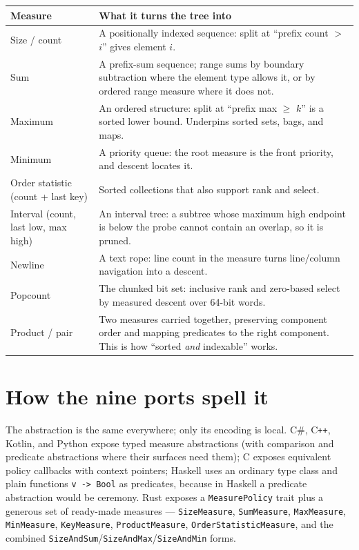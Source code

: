 \documentclass[11pt,twoside,openright]{book}
\makeatletter
\newcommand{\code}[1]{\texorpdfstring{\textcolor{d7ink}{\texttt{#1}}}{#1}}
\newenvironment{d7table}[1]
  {\par\vspace{3pt}\small
   \setlength{\LTpre}{4pt}\setlength{\LTpost}{4pt}
   \begin{longtable}{@{}%
     >{\raggedright\arraybackslash}p{#1\textwidth}%
     @{\hspace{10pt}}%
     >{\raggedright\arraybackslash}p{\dimexpr\textwidth-#1\textwidth-10pt\relax}@{}}}
  {\end{longtable}}
\newcommand{\thead}[1]{\sffamily\bfseries\footnotesize\color{d7ink}#1}
\makeatother
\begin{document}
\begin{d7table}{0.24}
\toprule
\thead{Measure} & \thead{What it turns the tree into} \\
\midrule
Size / count & A positionally indexed sequence: split at ``prefix count $>$ $i$''
gives element $i$. \\
Sum & A prefix-sum sequence; range sums by boundary subtraction where the
element type allows it, or by ordered range measure where it does not. \\
Maximum & An ordered structure: split at ``prefix max $\geq$ $k$'' is a sorted
lower bound. Underpins sorted sets, bags, and maps. \\
Minimum & A priority queue: the root measure is the front priority, and descent
locates it. \\
Order statistic (count + last key) & Sorted collections that also support rank
and select. \\
Interval (count, last low, max high) & An interval tree: a subtree whose maximum
high endpoint is below the probe cannot contain an overlap, so it is pruned. \\
Newline & A text rope: line count in the measure turns line/column navigation
into a descent. \\
Popcount & The chunked bit set: inclusive rank and zero-based select by measured
descent over 64-bit words. \\
Product / pair & Two measures carried together, preserving component order and
mapping predicates to the right component. This is how ``sorted \emph{and}
indexable'' works. \\
\bottomrule
\end{d7table}

\section{How the nine ports spell it}

The abstraction is the same everywhere; only its encoding is local. C\#,
C\texttt{++}, Kotlin, and Python expose typed measure abstractions (with
comparison and predicate abstractions where their surfaces need them); C exposes
equivalent policy callbacks with context pointers; Haskell uses an ordinary
type class and plain functions \code{v -> Bool} as predicates, because in
Haskell a predicate abstraction would be ceremony. Rust exposes a
\code{MeasurePolicy} trait plus a generous set of ready-made measures ---
\code{SizeMeasure}, \code{SumMeasure}, \code{MaxMeasure}, \code{MinMeasure},
\code{KeyMeasure}, \code{ProductMeasure}, \code{OrderStatisticMeasure}, and the
combined \code{SizeAndSum}/\code{SizeAndMax}/\code{SizeAndMin} forms.
\end{document}
